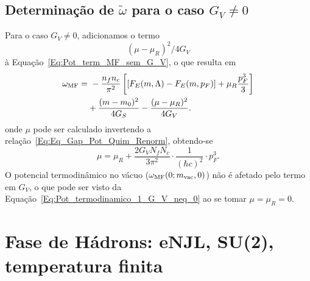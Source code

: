 \subsection{Determinação de $\tilde\omega$ para o caso $G_V \neq 0$}

Para o caso $G_V \neq 0$, adicionamos o termo 
\begin{equation}
	(\mu-\mu_R)^2 / 4G_V
\end{equation}
%
à Equação~\eqref{Eq:Pot_term_MF_sem_G_V}, o que resulta em 
\begin{equation}\label{Eq:Pot_termodinamico_1_G_V_neq_0}
\begin{split}
\omega_{\rm{MF}} =&~ - \frac{n_f n_c}{\pi^2} \left[[F_E(m,\Lambda) - F_E(m, p_F)] + \mu_R \frac{p_F^3}{3} \right] \\
&+ \frac{(m-m_0)^2}{4G_S} - \frac{(\mu - \mu_R)^2}{4G_V}.
\end{split}
\end{equation}
%
onde $\mu$ pode ser calculado invertendo a relação~\eqref{Eq:Eq_Gap_Pot_Quim_Renorm}, obtendo-se
\begin{equation}
	\mu = \mu_R + \frac{2G_V N_fN_c}{3\pi^2} \cdot \frac{1}{(\hbar c)^2} \cdot p_F^3.
\end{equation}
%
O potencial termodinâmico no vácuo ($\omega_{\rm{MF}}(0; m_{\rm{vac}}, 0)$) não é afetado pelo termo em $G_V$, o que pode ser visto da Equação~\eqref{Eq:Pot_termodinamico_1_G_V_neq_0} ao se tomar $\mu = \mu_R = 0$.

\section{Fase de Hádrons: eNJL, SU(2), temperatura finita}

